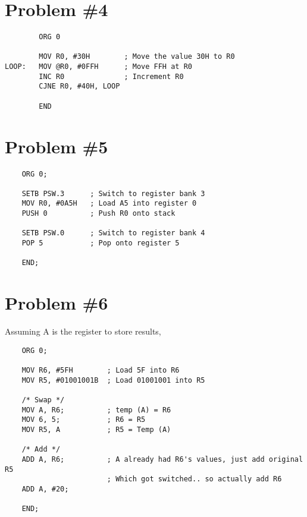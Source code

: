 \documentclass[12pt]{article}
\begin{document}
\section*{Problem \#4}
\begin{verbatim}
        ORG 0

        MOV R0, #30H        ; Move the value 30H to R0
LOOP:   MOV @R0, #0FFH      ; Move FFH at R0
        INC R0              ; Increment R0
        CJNE R0, #40H, LOOP

        END
\end{verbatim}

\section*{Problem \#5}
\begin{verbatim}
    ORG 0;

    SETB PSW.3      ; Switch to register bank 3
    MOV R0, #0A5H   ; Load A5 into register 0
    PUSH 0          ; Push R0 onto stack

    SETB PSW.0      ; Switch to register bank 4
    POP 5           ; Pop onto register 5

    END;
\end{verbatim}

\section*{Problem \#6}
Assuming A is the register to store results,

\begin{verbatim}
    ORG 0;

    MOV R6, #5FH        ; Load 5F into R6
    MOV R5, #01001001B  ; Load 01001001 into R5

    /* Swap */
    MOV A, R6;          ; temp (A) = R6
    MOV 6, 5;           ; R6 = R5
    MOV R5, A           ; R5 = Temp (A)

    /* Add */
    ADD A, R6;          ; A already had R6's values, just add original R5
                        ; Which got switched.. so actually add R6
    ADD A, #20;

    END;
\end{verbatim}
\end{document}
